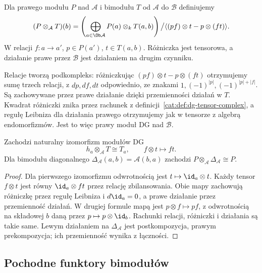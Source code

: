 \begin{definicja}\label{cat:def:morita-balanced-tensor}
Dla prawego modułu $P$ nad $\mathcal A$ i bimodułu $T$ od $\mathcal A$ do $\mathcal B$ definiujemy
\[
 (P\otimes_{\mathcal A}T)(b)=
 \left(\bigoplus_{a\in\Ob\mathcal A}P(a)\otimes_k T(a,b)\right)
 \big/\langle(pf)\otimes t-p\otimes(ft)\rangle.
\]
W relacji $f:a\to a'$, $p\in P(a')$, $t\in T(a,b)$. Różniczka jest tensorowa, a działanie prawe przez $\mathcal B$ jest działaniem na drugim czynniku.
\end{definicja}

Relacje tworzą podkompleks: różniczkując $(pf)\otimes t-p\otimes(ft)$ otrzymujemy sumę trzech relacji, z $dp,df,dt$ odpowiednio, ze znakami $1,(-1)^{|p|},(-1)^{|p|+|f|}$. Są zachowywane przez prawe działanie dzięki przemienności działań w $T$. Kwadrat różniczki znika przez rachunek z definicji~\ref{cat:def:dg-tensor-complex}, a regułę Leibniza dla działania prawego otrzymujemy jak w tensorze z algebrą endomorfizmów. Jest to więc prawy moduł DG nad $\mathcal B$.

\begin{lemat}\label{cat:lem:morita-bimodule-yoneda}
Zachodzi naturalny izomorfizm modułów DG
\[
 h_a\otimes_{\mathcal A}T\cong T_a,
 \qquad f\otimes t\longmapsto ft.
\]
Dla bimodułu diagonalnego $\Delta_{\mathcal A}(a,b)=\mathcal A(b,a)$ zachodzi $P\otimes_{\mathcal A}\Delta_{\mathcal A}\cong P$.
\end{lemat}
\begin{proof}
Dla pierwszego izomorfizmu odwrotnością jest $t\mapsto\id_a\otimes t$. Każdy tensor $f\otimes t$ jest równy $\id_a\otimes ft$ przez relację zbilansowania. Obie mapy zachowują różniczkę przez regułę Leibniza i $d\id_a=0$, a prawe działanie przez przemienność działań. W drugiej formule mapą jest $p\otimes f\mapsto pf$, z odwrotnością na składowej $b$ daną przez $p\mapsto p\otimes\id_b$. Rachunki relacji, różniczki i działania są takie same. Lewym działaniem na $\Delta_{\mathcal A}$ jest postkompozycja, prawym prekompozycja; ich przemienność wynika z łączności.
\end{proof}

\subsection{Pochodne funktory bimodułów}


